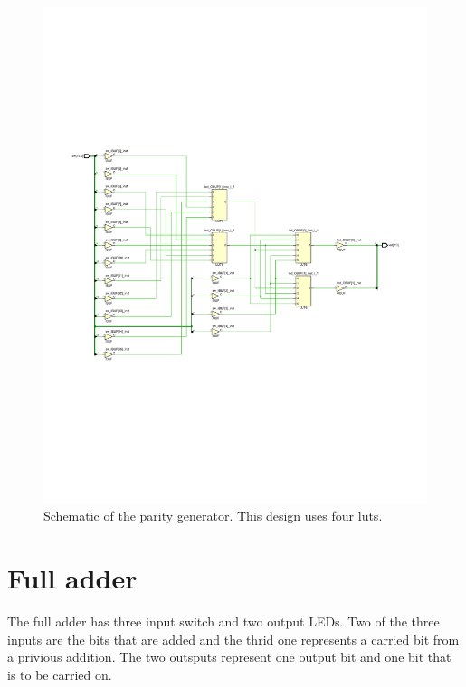 \begin{figure}[h]
	\centering
	\includegraphics[width=\linewidth, trim=0mm 80mm 0mm 80mm]{./L1/E3/schematic.pdf}
	\caption{Schematic of the parity generator. This design uses four \glspl{lut}.}
	\label{fig: Parity Generator schematic}
\end{figure}



\section{Full adder}

The full adder has three input switch and two output LEDs. Two of the three inputs are the bits that are added and the thrid one represents a carried bit from a privious addition. The two outsputs represent one output bit and one bit that is to be carried on. 

